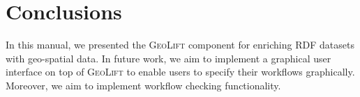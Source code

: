 \documentclass[a4paper,twoside,bibtotoc,abstracton,12pt,BCOR=15mm]{article}
\newcommand{\geolift}{\textsc{GeoLift}\xspace}
\begin{document}
\section{Conclusions}
In this manual, we presented the \geolift component for enriching RDF datasets with geo-spatial data.
In future work, we aim to implement a graphical user interface on top of \geolift to enable users to specify their workflows graphically.
Moreover, we aim to implement workflow checking functionality.



\end{document}
